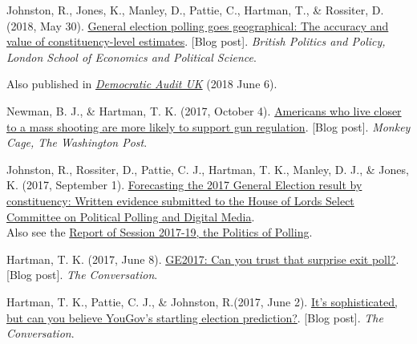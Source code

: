 \documentclass[12pt]{article}
\begin{document}
\begin{bibenum}
\item Johnston, R., Jones, K., Manley, D.,  Pattie, C., {Hartman, T.}, \& Rossiter, D. (2018, May 30).
\href{http://blogs.lse.ac.uk/politicsandpolicy/constituency-level-estimates/}
{General election polling goes geographical: The accuracy and value of constituency-level estimates}. 
[Blog post]. \textit{British Politics and Policy, London School of Economics and Political Science}.

Also published in 
\href{http://www.democraticaudit.com/2018/06/06/general-election-polling-goes-geographical-the-accuracy-and-value-of-constituency-level-estimates/}{\textit{Democratic Audit UK}} (2018 June 6). 

\item Newman, B. J., \& Hartman, T. K. (2017, October 4). 
\href{https://www.washingtonpost.com/news/monkey-cage/wp/2017/10/03/americans-who-live-closer-to-a-mass-shooting-are-more-likely-to-support-gun-regulation/}{Americans who live closer to a mass shooting are more likely to support gun regulation}. [Blog post].
    \textit{Monkey Cage, The Washington Post}.  

\item Johnston, R., Rossiter, D., Pattie, C. J., {Hartman, T. K.}, Manley, D. J., \& Jones, K. (2017, September 1).
\href{https://www.parliament.uk/documents/lords-committees/political-polling-digital-media/Political-Polling-and-Digital-Media-Committee-Oral-and-Written-Evidence.pdf}
{Forecasting the 2017 General Election result by constituency: Written evidence submitted to the House of Lords Select Committee on Political Polling and Digital Media}.\\
Also see the \href{https://publications.parliament.uk/pa/ld201719/ldselect/ldppdm/106/106.pdf}
{Report of Session 2017-19, the Politics of Polling}.

        \item Hartman, T. K. (2017, June 8). 
    \href{https://theconversation.com/ge2017-can-you-trust-that-surprise-exit-poll-79170}
    {GE2017: Can you trust that surprise exit poll?}. [Blog post]. 
    \textit{The Conversation}.

    \item Hartman, T. K., Pattie, C. J., \& Johnston, R.(2017, June 2). 
    \href{https://theconversation.com/its-sophisticated-but-can-you-believe-yougovs-startling-election-prediction-78701}
    {It's sophisticated, but can you believe YouGov's startling election prediction?}. [Blog post]. 
    \textit{The Conversation}.


\end{bibenum}
\end{document}
